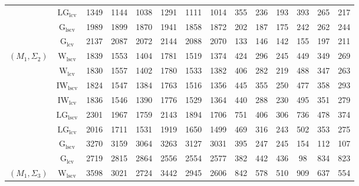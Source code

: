 \begin{table}[!ht]
{\begin{tabular}{@{}cc|ccc|ccc|ccc|ccc@{}}
 & $\mathrm{LG}_{\mathrm{lcv}}$ & 1349 & 1144 & 1038 & 1291 & 1111 & 1014 & 355 & 236 & 193 & 393 & 265 & 217 \\ 
 & $\mathrm{G}_{\mathrm{lscv}}$ & 1989 & 1899 & 1870 & 1941 & 1858 & 1872 & \cellcolor{black!10}202 & \cellcolor{black!10}187 & 175 & \cellcolor{black!10}242 & 262 & 244 \\ 
 & $\mathrm{G}_{\mathrm{lcv}}$ & 2137 & 2087 & 2072 & 2144 & 2088 & 2070 & \cellcolor{black!30}133 & \cellcolor{black!30}146 & \cellcolor{black!30}142 & \cellcolor{black!30}155 & \cellcolor{black!30}197 & 211 \\ 
\midrule
$(M_1,\Sigma_2)$ & $\mathrm{W}_{\mathrm{lscv}}$ & 1839 & 1553 & 1404 & 1781 & \cellcolor{black!10}1519 & 1374 & 424 & 296 & 245 & 449 & 349 & 269 \\ 
 & $\mathrm{W}_{\mathrm{lcv}}$ & \cellcolor{black!10}1830 & 1557 & 1402 & 1780 & 1533 & 1382 & 406 & \cellcolor{black!10}282 & \cellcolor{black!30}219 & 488 & \cellcolor{black!10}347 & \cellcolor{black!10}263 \\ 
 & $\mathrm{IW}_{\mathrm{lscv}}$ & \cellcolor{black!30}1824 & \cellcolor{black!10}1547 & \cellcolor{black!30}1384 & \cellcolor{black!30}1763 & \cellcolor{black!30}1516 & \cellcolor{black!30}1356 & 445 & 355 & 250 & 477 & 358 & 293 \\ 
 & $\mathrm{IW}_{\mathrm{lcv}}$ & 1836 & \cellcolor{black!30}1546 & \cellcolor{black!10}1390 & \cellcolor{black!10}1776 & 1529 & \cellcolor{black!10}1364 & 440 & 288 & \cellcolor{black!10}230 & 495 & 351 & 279 \\ 
 & $\mathrm{LG}_{\mathrm{lscv}}$ & 2301 & 1967 & 1759 & 2143 & 1894 & 1706 & 751 & 406 & 306 & 736 & 478 & 374 \\ 
 & $\mathrm{LG}_{\mathrm{lcv}}$ & 2016 & 1711 & 1531 & 1919 & 1650 & 1499 & 469 & 316 & 243 & 502 & 353 & 275 \\ 
 & $\mathrm{G}_{\mathrm{lscv}}$ & 3270 & 3159 & 3064 & 3263 & 3127 & 3031 & \cellcolor{black!10}395 & \cellcolor{black!30}247 & 245 & \cellcolor{black!10}154 & \cellcolor{black!30}112 & \cellcolor{black!30}107 \\ 
 & $\mathrm{G}_{\mathrm{lcv}}$ & 2719 & 2815 & 2864 & 2556 & 2554 & 2577 & \cellcolor{black!30}382 & 442 & 436 & \cellcolor{black!30}98 & 834 & 823 \\ 
\midrule
$(M_1,\Sigma_3)$ & $\mathrm{W}_{\mathrm{lscv}}$ & 3598 & \cellcolor{black!10}3021 & 2724 & 3442 & 2945 & \cellcolor{black!30}2606 & 842 & \cellcolor{black!10}578 & \cellcolor{black!10}510 & 909 & 637 & 554 \\ 

\end{tabular}}
\end{table}
